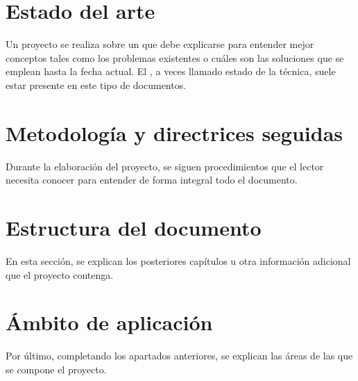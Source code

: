 \section{Estado del arte}

Un proyecto se realiza sobre un  que debe explicarse para entender mejor conceptos tales como los problemas existentes o cuáles son las soluciones que se emplean hasta la fecha actual. El , a veces llamado estado de la técnica, suele estar presente en este tipo de documentos.

\section{Metodología y directrices seguidas}

Durante la elaboración del proyecto, se siguen procedimientos que el lector necesita conocer para entender de forma integral todo el documento.

\section{Estructura del documento}

En esta sección, se explican los posteriores capítulos u otra información adicional que el proyecto contenga.

\section{Ámbito de aplicación}

Por último, completando los apartados anteriores, se explican las áreas de las que se compone el proyecto.

\chapterend
